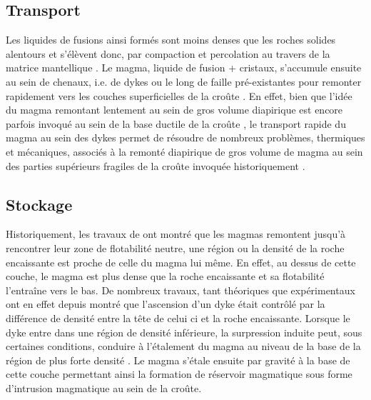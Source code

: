 \subsection{Transport}
\label{sec:transport}

Les liquides de fusions ainsi formés  sont moins denses que les roches
solides alentours et s'élèvent donc,  par compaction et percolation au
travers          de           la          matrice          mantellique
\citep{McKenzy:1984bo,McKenzie:1985jq}. Le magma,  liquide de fusion +
cristaux, s'accumule ensuite au sein de  chenaux, i.e.  de dykes ou le
long  de  faille  pré-existantes  pour remonter  rapidement  vers  les
couches          superficielles          de         la          croûte
\citep{Lister:1991ut,Clemens:1992kr,Petford:1993bk,Rubin:1995upa}.  En
effet, bien  que l'idée du magma  remontant lentement au sein  de gros
volume  diapirique est  encore  parfois  invoqué au  sein  de la  base
ductile  de  la   croûte  \citep{Weinberg:1994jg,Weinberg:1996vb},  le
transport rapide  du magma  au sein  des dykes  permet de  résoudre de
nombreux problèmes,  thermiques et  mécaniques, associés à  la remonté
diapirique  de gros  volume de  magma au  sein des  parties supérieurs
fragiles de  la croûte invoquée  historiquement \citep{Miller:1999km}.

\subsection{Stockage}
\label{sec:stockage}

Historiquement, les  travaux de  \citet{Walker:1989jq} ont  montré que
les  magmas  remontent jusqu'à  rencontrer  leur  zone de  flotabilité
neutre, une région ou la densité de la roche encaissante est proche de
celle du magma lui même. En effet, au dessus de cette couche, le magma
est plus dense  que la roche encaissante et  sa flotabilité l'entraîne
vers    le    bas.     De   nombreux    travaux,    tant    théoriques
\citep{Lister:1991ut,Petford:1993bk,Rubin:1995upa}  que  expérimentaux
\citep{Taisne:2009kj,Taisne:2011do}  ont en  effet  depuis montré  que
l'ascension  d'un dyke  était contrôlé  par la  différence de  densité
entre la  tête de celui  ci et la  roche encaissante. Lorsque  le dyke
entre dans  une région de  densité inférieure, la  surpression induite
peut, sous  certaines conditions, conduire  à l'étalement du  magma au
niveau   de   la  base   de   la   région   de  plus   forte   densité
\citep{Taisne:2011do}. Le magma s'étale ensuite  par gravité à la base
de cette couche permettant ainsi  la formation de réservoir magmatique
sous forme d'intrusion magmatique au sein de la croûte.

